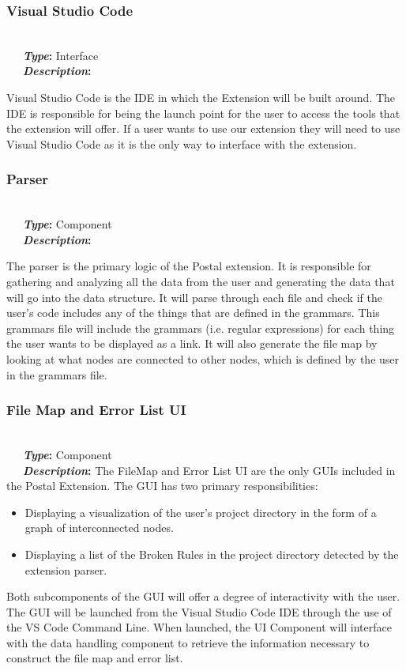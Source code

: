 \documentclass[letterpaper,10pt,titlepage,draftclsnofoot,onecolumn,onesided] {IEEEtran}
\newcommand{\bolditin}[2]{
	\-\ \-\ \-\ \textbf{\textit{#1}#2}
}
\begin{document}
\subsubsection{Visual Studio Code}
\hfill \\
\bolditin{Type}{:} Interface \\
\bolditin{Description}{:} 
Visual Studio Code is the IDE in which the Extension will be built around.
The IDE is responsible for being the launch point for the user to access the tools that the extension will offer.
If a user wants to use our extension they will need to use Visual Studio Code as it is the only way to interface with the extension.

\subsubsection{Parser}
\hfill \\
\bolditin{Type}{:} Component \\
\bolditin{Description}{:} 
The parser is the primary logic of the Postal extension. 
It is responsible for gathering and analyzing all the data from the user and generating the data that will go into the data structure.
It will parse through each file and check if the user's code includes any of the things that are defined in the grammars.
This grammars file will include the grammars (i.e. regular expressions) for each thing the user wants to be displayed as a link.
It will also generate the file map by looking at what nodes are connected to other nodes, which is defined by the user in the grammars file.
		
\subsubsection{File Map and Error List UI}
\hfill \\
\bolditin{Type}{:} Component \\
\bolditin{Description}{:}  The FileMap and Error List UI are the only GUIs included in the Postal Extension. 
The GUI has two primary responsibilities: 
\begin{itemize}
	\item Displaying a visualization of the user's project directory in the form of a graph of interconnected nodes.
	\item Displaying a list of the Broken Rules in the project directory detected by the extension parser.
\end{itemize}
Both subcomponents of the GUI will offer a degree of interactivity with the user. 
The GUI will be launched from the Visual Studio Code IDE through the use of the VS Code Command Line.
When launched, the UI Component will interface with the data handling component to retrieve the information necessary to construct the file map and error list.
\end{document}

